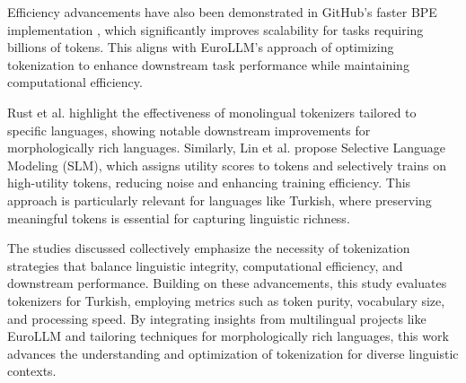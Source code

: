 Efficiency advancements have also been demonstrated in GitHub's faster BPE implementation \cite{neubeck_so_2024}, which significantly improves scalability for tasks requiring billions of tokens. This aligns with EuroLLM’s approach of optimizing tokenization to enhance downstream task performance while maintaining computational efficiency.

Rust et al. \cite{rust_how_2021} highlight the effectiveness of monolingual tokenizers tailored to specific languages, showing notable downstream improvements for morphologically rich languages. Similarly, Lin et al. \cite{lin_not_nodate} propose Selective Language Modeling (SLM), which assigns utility scores to tokens and selectively trains on high-utility tokens, reducing noise and enhancing training efficiency. This approach is particularly relevant for languages like Turkish, where preserving meaningful tokens is essential for capturing linguistic richness.

The studies discussed collectively emphasize the necessity of tokenization strategies that balance linguistic integrity, computational efficiency, and downstream performance. Building on these advancements, this study evaluates tokenizers for Turkish, employing metrics such as token purity, vocabulary size, and processing speed. By integrating insights from multilingual projects like EuroLLM and tailoring techniques for morphologically rich languages, this work advances the understanding and optimization of tokenization for diverse linguistic contexts.